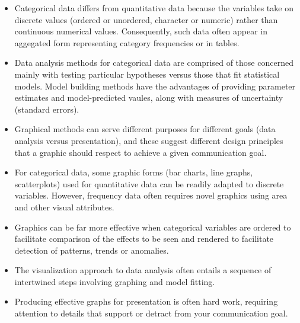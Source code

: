 
\begin{itemize}

  \item Categorical data differs from quantitative data because the variables take on
  discrete values (ordered or unordered, character or numeric) 
  rather than continuous numerical values. Consequently,
  such data often appear in aggegated form representing category frequencies or in tables.
  
  \item Data analysis methods for categorical data are comprised of those concerned mainly
  with testing particular hypotheses versus those that fit statistical models.
  Model building methods have the advantages of providing parameter estimates and 
  model-predicted vaules, along with measures of uncertainty (standard errors).
  
  \item Graphical methods can serve different purposes for different goals
  (data analysis versus presentation), and these suggest different design
  principles that a graphic should respect to achieve a given communication goal.
  
  \item For categorical data, some graphic forms (bar charts, line graphs,
  scatterplots) used for quantitative data can be readily adapted to
  discrete variables.
  However, frequency data often requires novel graphics using area and other
  visual attributes.
  
  \item Graphics can be far more effective when categorical variables are ordered
  to facilitate comparison of the effects to be seen and rendered to facilitate
  detection of patterns, trends or anomalies.
  
  \item The visualization approach to data analysis often entails a sequence of 
  intertwined steps  involving graphing and model fitting.  
  
  \item Producing effective graphs for presentation is often hard work, requiring
  attention to details that support or detract from your communication goal.
\end{itemize}
